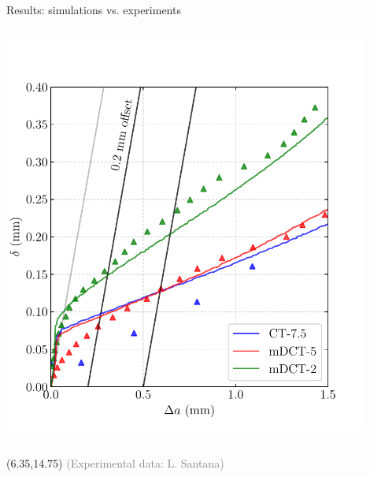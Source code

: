 \documentclass[9pt]{beamer}
\begin{document}
\begin{frame}{Results: simulations vs. experiments}
\begin{columns}
    \centering
    \includegraphics[width=0.9\textwidth]{Images/plot_CTOD-da_ALL_X52.pdf}
\end{columns}

	\begin{textblock}{6}(6.35,14.75)
        \textcolor{gray}{\scriptsize (Experimental data: L. Santana)}
    \end{textblock}

\end{frame}

\end{document}
